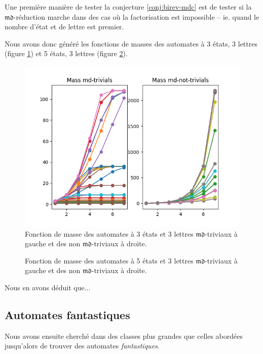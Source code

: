 \documentclass[11pt,a4paper]{article}
\begin{document}
Une première manière de tester la conjecture \ref{conj:birev-mdc} est de tester si la $\mathfrak{md}$-réduction marche dans des cas où la factorisation est impossible -- ie. quand le nombre d'état et de lettre est premier.

Nous avons donc généré les fonctions de masses des automates à 3 états, 3 lettres (figure \ref{fig:mass-33}) et 5 états, 3 lettres (figure \ref{fig:mass-53}).

\begin{figure}[h]
  \centering
  \includegraphics[width=\textwidth]{mass_33.png}
  \caption{Fonction de masse des automates à 3 états et 3 lettres $\mathfrak{md}$-triviaux à gauche et des non $\mathfrak{md}$-triviaux à droite.\label{fig:mass-33}}
\end{figure}

\begin{figure}[h]
  \centering
  \caption{Fonction de masse des automates à 5 états et 3 lettres $\mathfrak{md}$-triviaux à gauche et des non $\mathfrak{md}$-triviaux à droite.\label{fig:mass-53}}
\end{figure}

Nous en avons déduit que...

\subsection{Automates fantastiques}

Nous avons ensuite cherché dans des classes plus grandes que celles abordées jusqu'alors de trouver des automates \textit{fantastiques}.
\end{document}
